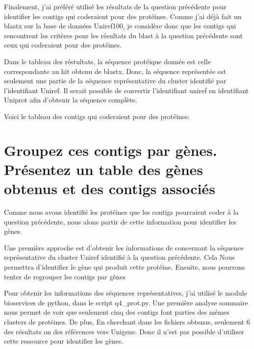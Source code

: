 \documentclass[10.9pt]{article} %
\begin{document}
Finalement, j'ai préféré utilisé les résultats de la question précédente pour identifier les contigs qui coderaient
pour des protéines. Comme j'ai déjà fait un blastx sur la base de données Uniref100, je considère donc que les contigs
qui rencontrent les critères pour les résultats du blast à la question précédente sont ceux qui coderaient pour des
protéines.

Dans le tableau des réstultats, la séquence protéique donnée est celle correspondante au hit obtenu de blastx. Donc, 
la séquence représentée est seulement une partie de la séquence représentative du cluster identifié par l'identifiant
Uniref. Il serait possible de convertir l'identifiant uniref en identifiant Uniprot afin d'obtenir la séquence complète.


Voici le tableau des contigs qui coderaient pour des protéines:






\section{Groupez ces contigs par gènes. Présentez un table des gènes obtenus et des contigs
associés} %

Comme nous avons identifié les protéines que les contigs pourraient coder à la question 
précédente, nous alons partir de cette information pour identifier les gènes.

Une première approche est d'obtenir les informations de concernant la séquence représentative
du cluster Uniref identifié à la question précédente. Cela Nous permettra d'identifier le
gène qui produit cette protéine. Ensuite, nous pourrons tenter de regrouper les contigs
par gènes

Pour obtenir les informations des séquences représentatives, j'ai utilisé le module bioservices
de python, dans le script q4\_prot.py. Une première analyse sommaire nous permet de voir que
seulement cinq des contigs font parties des mêmes clusters de protéines. De plus, En cherchant dans
les fichiers obtenus, seulement 6 des résultats on des références vers Unigene. Donc il n'est
pas possible d'utiliser cette ressource pour identifier les gènes.
\end{document}
